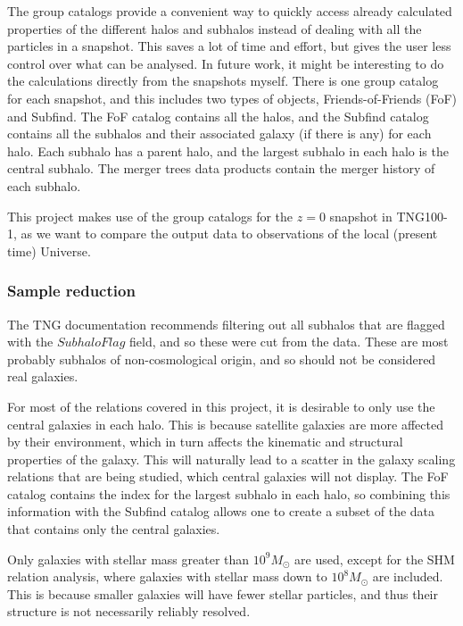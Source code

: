 The group catalogs provide a convenient way to quickly access already calculated properties of the different halos and subhalos instead of dealing with all the particles in a snapshot. This saves a lot of time and effort, but gives the user less control over what can be analysed. In future work, it might be interesting to do the calculations directly from the snapshots myself. There is one group catalog for each snapshot, and this includes two types of objects, Friends-of-Friends (FoF) and Subfind. The FoF catalog contains all the halos, and the Subfind catalog contains all the subhalos and their associated galaxy (if there is any) for each halo. Each subhalo has a parent halo, and the largest subhalo in each halo is the central subhalo. The merger trees data products contain the merger history of each subhalo.

This project makes use of the group catalogs for the $z = 0$ snapshot in TNG100-1, as we want to compare the output data to observations of the local (present time) Universe.

\subsubsection{Sample reduction}

The TNG documentation recommends filtering out all subhalos that are flagged with the $SubhaloFlag$ field, and so these were cut from the data. These are most probably subhalos of non-cosmological origin, and so should not be considered real galaxies.

For most of the relations covered in this project, it is desirable to only use the central galaxies in each halo. This is because satellite galaxies are more affected by their environment, which in turn affects the kinematic and structural properties of the galaxy. This will naturally lead to a scatter in the galaxy scaling relations that are being studied, which central galaxies will not display. The FoF catalog contains the index for the largest subhalo in each halo, so combining this information with the Subfind catalog allows one to create a subset of the data that contains only the central galaxies.

Only galaxies with stellar mass greater than $10^9 M_{\odot}$ are used, except for the SHM relation analysis, where galaxies with stellar mass down to $10^8 M_{\odot}$ are included. This is because smaller galaxies will have fewer stellar particles, and thus their structure is not necessarily reliably resolved.

